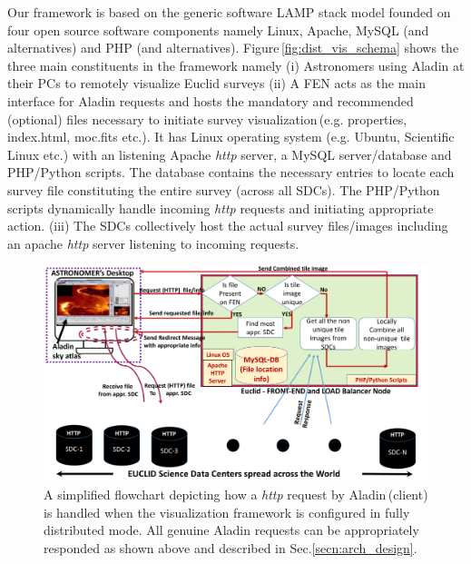 \documentclass[11pt,twoside]{article}
\begin{document}
Our framework is based on the generic software LAMP stack model founded on four open source software components namely Linux, Apache, MySQL (and alternatives) and PHP (and alternatives). Figure\,\ref{fig:dist_vis_schema} shows the three main  constituents in the framework namely (i) Astronomers using Aladin at their PCs to remotely visualize Euclid surveys (ii) A FEN acts  as the main interface for Aladin requests and hosts the mandatory and recommended\,(optional) files necessary to initiate survey  visualization\,(e.g. properties, index.html, moc.fits etc.).  It has Linux operating system (e.g. Ubuntu, Scientific Linux etc.) with an listening Apache {\it{http}} server, a MySQL server/database and PHP/Python scripts.  The database contains the necessary entries to locate each survey file constituting  the entire survey (across all SDCs). The PHP/Python scripts dynamically handle incoming {\it{http}} requests and initiating appropriate action.  (iii) The SDCs collectively host the actual survey files/images including an apache {\it{http}} server listening to incoming requests.  %

 

\begin{figure}[ht]
    \centering
   \includegraphics[width=\textwidth]{euclid_sweta_slide_DVisualization_Distributed_30Sep2019_v1_forpaper.png}
    \caption{A simplified flowchart depicting how a {\it{http}} request by Aladin\,(client) is handled when  the visualization framework is configured in fully distributed mode. All genuine Aladin requests can be appropriately responded as shown above and described in Sec.\ref{secn:arch_design}.}
    \label{fig:dist_vis_schema_flowchart}
\end{figure}
\end{document}

